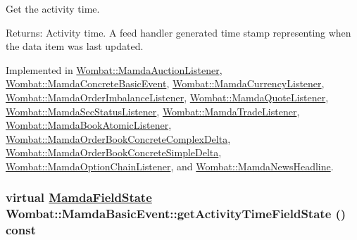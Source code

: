 Get the activity time. 

\begin{Desc}
\item[Returns:]Activity time. A feed handler generated time stamp representing when the data item was last updated. \end{Desc}


Implemented in \hyperlink{classWombat_1_1MamdaAuctionListener_1e1e7f267e1681fe0edddd1a9748bc9e}{Wombat::Mamda\-Auction\-Listener}, \hyperlink{classWombat_1_1MamdaConcreteBasicEvent_ee6d9ec8ed5a8443b5f4812a7a5af0a3}{Wombat::Mamda\-Concrete\-Basic\-Event}, \hyperlink{classWombat_1_1MamdaCurrencyListener_3d35c47919af62b2900d2c560b66d898}{Wombat::Mamda\-Currency\-Listener}, \hyperlink{classWombat_1_1MamdaOrderImbalanceListener_f6441d47955f9cf7d8572a7c6e2816d3}{Wombat::Mamda\-Order\-Imbalance\-Listener}, \hyperlink{classWombat_1_1MamdaQuoteListener_367521366aaadbe118e70ab32508d7c4}{Wombat::Mamda\-Quote\-Listener}, \hyperlink{classWombat_1_1MamdaSecStatusListener_e68b03d56c3402e337a06b63ef5566d1}{Wombat::Mamda\-Sec\-Status\-Listener}, \hyperlink{classWombat_1_1MamdaTradeListener_6262a8a8952d505d580832d5f7bec078}{Wombat::Mamda\-Trade\-Listener}, \hyperlink{classWombat_1_1MamdaBookAtomicListener_84a6cb534ed359f19138a48d9f1f2812}{Wombat::Mamda\-Book\-Atomic\-Listener}, \hyperlink{classWombat_1_1MamdaOrderBookConcreteComplexDelta_92fbba5b38824d35c83df4f7c4d3c988}{Wombat::Mamda\-Order\-Book\-Concrete\-Complex\-Delta}, \hyperlink{classWombat_1_1MamdaOrderBookConcreteSimpleDelta_83a181dbc82a58ab1c7bd3565780e7bd}{Wombat::Mamda\-Order\-Book\-Concrete\-Simple\-Delta}, \hyperlink{classWombat_1_1MamdaOptionChainListener_4a54b34d8e87413ea30e83b8e75d9d78}{Wombat::Mamda\-Option\-Chain\-Listener}, and \hyperlink{classWombat_1_1MamdaNewsHeadline_cbd418bb5063ec7b524a50818f8a0893}{Wombat::Mamda\-News\-Headline}.\hypertarget{classWombat_1_1MamdaBasicEvent_a61a566e3442181ca1fadc4524296cd0}{
\subsubsection[getActivityTimeFieldState]{\setlength{\rightskip}{0pt plus 5cm}virtual \hyperlink{namespaceWombat_93aac974f2ab713554fd12a1fa3b7d2a}{Mamda\-Field\-State} Wombat::Mamda\-Basic\-Event::get\-Activity\-Time\-Field\-State () const}}
\label{classWombat_1_1MamdaBasicEvent_a61a566e3442181ca1fadc4524296cd0}


